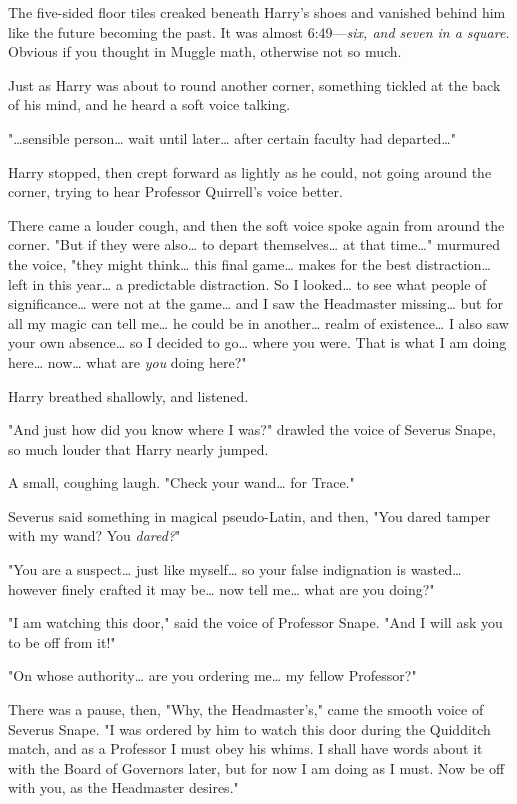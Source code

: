 The five-sided floor tiles creaked beneath Harry's shoes and vanished behind 
him like the future becoming the past. It was almost 6:49---\emph{six, and seven 
in a square.} Obvious if you thought in Muggle math, otherwise not so much.

Just as Harry was about to round another corner, something tickled at the back 
of his mind, and he heard a soft voice talking.

"{\ldots}sensible person{\ldots} wait until later{\ldots} after certain faculty 
had departed{\ldots}"

Harry stopped, then crept forward as lightly as he could, not going around the 
corner, trying to hear Professor Quirrell's voice better.

There came a louder cough, and then the soft voice spoke again from around the 
corner. "But if they were also{\ldots} to depart themselves{\ldots} at that 
time{\ldots}" murmured the voice, "they might think{\ldots} this final 
game{\ldots} makes for the best distraction{\ldots} left in this year{\ldots} a 
predictable distraction. So I looked{\ldots} to see what people of 
significance{\ldots} were not at the game{\ldots} and I saw the Headmaster 
missing{\ldots} but for all my magic can tell me{\ldots} he could be in 
another{\ldots} realm of existence{\ldots} I also saw your own absence{\ldots} 
so I decided to go{\ldots} where you were. That is what I am doing here{\ldots} 
now{\ldots} what are \emph{you} doing here?"

Harry breathed shallowly, and listened.

"And just how did you know where I was?" drawled the voice of Severus Snape, so 
much louder that Harry nearly jumped.

A small, coughing laugh. "Check your wand{\ldots} for Trace."

Severus said something in magical pseudo-Latin, and then, "You dared tamper 
with my wand? You \emph{dared?}"

"You are a suspect{\ldots} just like myself{\ldots} so your false indignation 
is wasted{\ldots} however finely crafted it may be{\ldots} now tell me{\ldots} 
what are you doing?"

"I am watching this door," said the voice of Professor Snape. "And I will ask 
you to be off from it!"

"On whose authority{\ldots} are you ordering me{\ldots} my fellow Professor?"

There was a pause, then, "Why, the Headmaster's," came the smooth voice of 
Severus Snape. "I was ordered by him to watch this door during the Quidditch 
match, and as a Professor I must obey his whims. I shall have words about it 
with the Board of Governors later, but for now I am doing as I must. Now be off 
with you, as the Headmaster desires."

